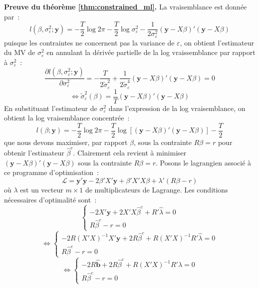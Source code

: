 \documentclass[10pt]{beamer}
\theoremstyle{plain}
\begin{document}
\begin{notes}

  \textbf{Preuve du théorème \ref{thm:constrained_ml}.} La vraisemblance est donnée par~:
  \[
    l\left( \beta, \sigma_{\varepsilon}^2; \mathbf y \right) = -\frac{T}{2}\log 2\pi - \frac{T}{2} \log\sigma_{\varepsilon}^2 - \frac{1}{2\sigma_{\varepsilon}^2}\left( \mathbf y - X\beta \right)'\left( \mathbf y - X\beta \right)
  \]
  puisque les contraintes ne concernent pas la variance de $\varepsilon$, on obtient l'estimateur du MV de $\sigma_{\varepsilon}^2$ en annulant la dérivée partielle de la log vraissemblance par rapport à $\sigma_{\varepsilon}^2$~:
  \[
    \frac{\partial l\left( \beta, \sigma_{\varepsilon}^2; \mathbf y \right)}{\partial \sigma_{\varepsilon}^2} = -\frac{T}{2\tilde\sigma_{\varepsilon}^2} + \frac{1}{2\tilde\sigma_{\varepsilon}^4}\left(\mathbf y - X\beta \right)'\left(\mathbf y - X\beta\right) = 0
  \]
  \[
    \Leftrightarrow \tilde \sigma_{\varepsilon}^2(\beta) = \frac{1}{T}\left(\mathbf y - X\beta \right)'\left(\mathbf y - X\beta  \right)
  \]
  En substituant l'estimateur de $\sigma_{\varepsilon}^2$ dans l'expression de la log vraisemblance, on obtient la log vraisemblance concentrée~:
  \[
    l\left( \beta ; \mathbf y \right) = -\frac{T}{2}\log 2\pi - \frac{T}{2}\log\left[\left(\mathbf y - X\beta \right)'\left(\mathbf y - X\beta  \right)\right] - \frac{T}{2}
  \]
  que nous devons maximiser, par rapport $\beta$, sous la contrainte $R\beta=r$ pour obtenir l'estimateur $\hat\beta^c$. Clairement cela revient à minimiser $\left(\mathbf y - X\beta \right)'\left(\mathbf y - X\beta  \right)$ sous la contrainte $R\beta=r$. Posons le lagrangien associé à ce programme d'optimisation~:
  \[
    \mathcal L = \mathbf y'\mathbf y - 2\beta'X'\mathbf y + \beta'X'X\beta + \lambda'\left( R\beta-r\right)
  \]
  où $\lambda$ est un vecteur $m\times 1$ de multiplicateurs de Lagrange. Les conditions nécessaires d'optimalité sont~:
  \[
    \begin{cases}
      -2X'\mathbf y + 2X'X\hat\beta^c + R'\hat\lambda = 0\\
      R\hat\beta^c -r = 0

    \end{cases}
  \]
\[
    \Leftrightarrow\begin{cases}
      -2R(X'X)^{-1}X'\mathbf y + 2R\hat\beta^c + R(X'X)^{-1}R'\hat\lambda = 0\\
      R\hat\beta^c -r = 0

    \end{cases}
  \]
  \[
    \Leftrightarrow\begin{cases}
      -2R\hat{\mathbf b} + 2R\hat\beta^c + R(X'X)^{-1}R'\hat\lambda = 0\\
      R\hat\beta^c -r = 0


\end{cases}\]
\end{notes}
\end{document}
